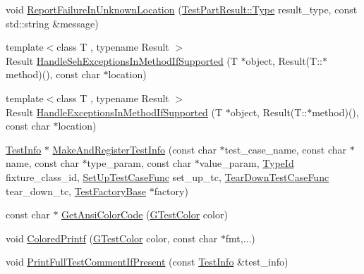 \begin{DoxyCompactItemize}
\item 
void \hyperlink{namespacetesting_1_1internal_a85f6ff0e40f9a5f10af66a73cf1364fa}{Report\-Failure\-In\-Unknown\-Location} (\hyperlink{classtesting_1_1_test_part_result_a65ae656b33fdfdfffaf34858778a52d5}{Test\-Part\-Result\-::\-Type} result\-\_\-type, const std\-::string \&message)
\item 
{\footnotesize template$<$class T , typename Result $>$ }\\Result \hyperlink{namespacetesting_1_1internal_ac5293b438139ef7ed05cb7fcaaf63545}{Handle\-Seh\-Exceptions\-In\-Method\-If\-Supported} (T $\ast$object, Result(T\-::$\ast$method)(), const char $\ast$location)
\item 
{\footnotesize template$<$class T , typename Result $>$ }\\Result \hyperlink{namespacetesting_1_1internal_addb2ed165b92b74e25fe9ebe9e46b9f9}{Handle\-Exceptions\-In\-Method\-If\-Supported} (T $\ast$object, Result(T\-::$\ast$method)(), const char $\ast$location)
\item 
\hyperlink{classtesting_1_1_test_info}{Test\-Info} $\ast$ \hyperlink{namespacetesting_1_1internal_a8280dfb4f7c8d5b71184f91f4725f759}{Make\-And\-Register\-Test\-Info} (const char $\ast$test\-\_\-case\-\_\-name, const char $\ast$name, const char $\ast$type\-\_\-param, const char $\ast$value\-\_\-param, \hyperlink{namespacetesting_1_1internal_a38c435cbab5f8b784e2e7f3356cab242}{Type\-Id} fixture\-\_\-class\-\_\-id, \hyperlink{namespacetesting_1_1internal_ada14d66b5460b20e09071f51b9885c8d}{Set\-Up\-Test\-Case\-Func} set\-\_\-up\-\_\-tc, \hyperlink{namespacetesting_1_1internal_aad40244621b68546f3b830696225bf9b}{Tear\-Down\-Test\-Case\-Func} tear\-\_\-down\-\_\-tc, \hyperlink{classtesting_1_1internal_1_1_test_factory_base}{Test\-Factory\-Base} $\ast$factory)
\item 
const char $\ast$ \hyperlink{namespacetesting_1_1internal_ae132b16818cf4a060eb8d3940fe858f3}{Get\-Ansi\-Color\-Code} (\hyperlink{namespacetesting_1_1internal_a648c1bc94c2ef9e868ff3f9dff0f9c4e}{G\-Test\-Color} color)
\item 
void \hyperlink{namespacetesting_1_1internal_adef3055706176001364e54eb73a87e31}{Colored\-Printf} (\hyperlink{namespacetesting_1_1internal_a648c1bc94c2ef9e868ff3f9dff0f9c4e}{G\-Test\-Color} color, const char $\ast$fmt,...)
\item 
void \hyperlink{namespacetesting_1_1internal_a7a85ebe3b4de93a1edb091f92f1fb393}{Print\-Full\-Test\-Comment\-If\-Present} (const \hyperlink{classtesting_1_1_test_info}{Test\-Info} \&test\-\_\-info)

\end{DoxyCompactItemize}
